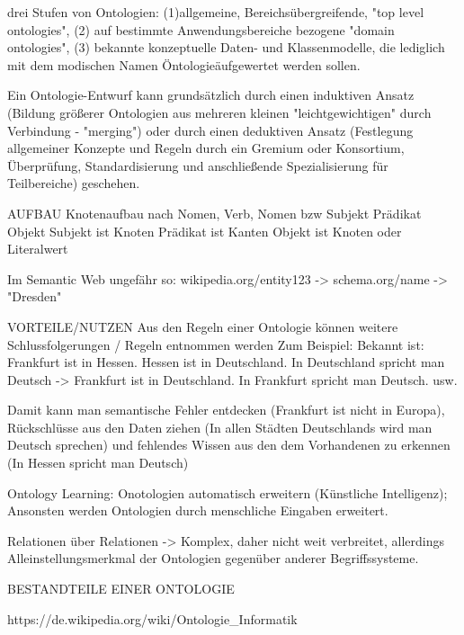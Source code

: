 	drei Stufen von Ontologien: (1)allgemeine, Bereichsübergreifende, "top level ontologies", (2) auf bestimmte Anwendungsbereiche bezogene "domain ontologies", (3) bekannte konzeptuelle Daten- und Klassenmodelle, die lediglich mit dem modischen Namen \"Ontologie\" aufgewertet werden sollen.

	Ein Ontologie-Entwurf kann grundsätzlich durch einen induktiven Ansatz (Bildung größerer Ontologien aus mehreren kleinen "leichtgewichtigen" durch Verbindung - "merging") oder durch einen deduktiven Ansatz (Festlegung allgemeiner Konzepte und Regeln durch ein Gremium oder Konsortium, Überprüfung, Standardisierung und anschließende Spezialisierung für Teilbereiche) geschehen.


		

AUFBAU		
	Knotenaufbau nach Nomen, Verb, Nomen bzw Subjekt Prädikat Objekt
	Subjekt ist Knoten
	Prädikat ist Kanten
	Objekt ist Knoten oder Literalwert
	
		Im Semantic Web ungefähr so:
			wikipedia.org/entity123 -> schema.org/name -> "Dresden"
			
VORTEILE/NUTZEN	
Aus den Regeln einer Ontologie können weitere Schlussfolgerungen / Regeln entnommen werden
	Zum Beispiel: Bekannt ist: Frankfurt ist in Hessen. Hessen ist in Deutschland. In Deutschland spricht man Deutsch -> Frankfurt ist in Deutschland. In Frankfurt spricht man Deutsch.
	usw.
	
	Damit kann man semantische Fehler entdecken (Frankfurt ist nicht in Europa), Rückschlüsse aus den Daten ziehen (In allen Städten Deutschlands wird man Deutsch sprechen) und fehlendes Wissen aus den dem Vorhandenen zu erkennen (In Hessen spricht man Deutsch)
	
	Ontology Learning: Onotologien automatisch erweitern (Künstliche Intelligenz); Ansonsten werden Ontologien durch menschliche Eingaben erweitert.
	
	Relationen über Relationen -> Komplex, daher nicht weit verbreitet, allerdings Alleinstellungsmerkmal der Ontologien gegenüber anderer Begriffssysteme.
	
BESTANDTEILE EINER ONTOLOGIE 
	
 	https://de.wikipedia.org/wiki/Ontologie\_Informatik

